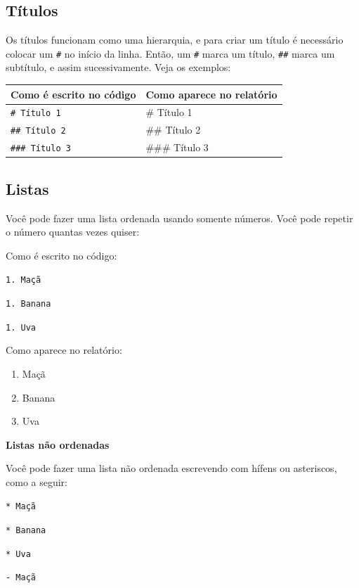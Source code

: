 \documentclass[
]{book}
\providecommand{\tightlist}{%
  \setlength{\itemsep}{0pt}\setlength{\parskip}{0pt}}
\begin{document}
\subsection{Títulos}\label{tuxedtulos}

Os títulos funcionam como uma hierarquia, e para criar um título é necessário colocar um \texttt{\#} no início da linha. Então, um \texttt{\#} marca um título, \texttt{\#\#} marca um subtítulo, e assim sucessivamente. Veja os exemplos:

\begin{longtable}[]{@{}ll@{}}
\toprule\noalign{}
Como é escrito no código & Como aparece no relatório \\
\midrule\noalign{}
\endhead
\bottomrule\noalign{}
\endlastfoot
\texttt{\#\ Título\ 1} & \# Título 1 \\
\texttt{\#\#\ Título\ 2} & \#\# Título 2 \\
\texttt{\#\#\#\ Título\ 3} & \#\#\# Título 3 \\
\end{longtable}

\subsection{Listas}\label{listas-1}

Você pode fazer uma lista ordenada usando somente números. Você pode repetir o número quantas vezes quiser:

Como é escrito no código:

\texttt{1.\ Maçã}

\texttt{1.\ Banana}

\texttt{1.\ Uva}

Como aparece no relatório:

\begin{enumerate}
\def\labelenumi{\arabic{enumi}.}
\tightlist
\item
  Maçã
\item
  Banana
\item
  Uva
\end{enumerate}

\textbf{Listas não ordenadas}

Você pode fazer uma lista não ordenada escrevendo com hífens ou asteriscos, como a seguir:

\texttt{*\ Maçã}

\texttt{*\ Banana}

\texttt{*\ Uva}

\texttt{-\ Maçã}
\end{document}
